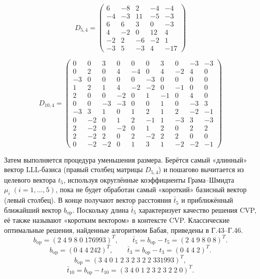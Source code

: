 \begin{equation}
D_{5,4} =
\begin{pmatrix}
  6 & -8 &  2 & -4 & -4 \\
 -4 & -3 & 11 & -5 & -3 \\
  6 &  6 &  3 &  0 & -3 \\
  4 & -2 &  0 & 12 &  4 \\
 -2 &  2 & -6 & -2 &  1 \\
 -3 &  5 & -3 &  4 & -17
\end{pmatrix}
\end{equation}

\begin{equation}
D_{10,4} =
\begin{pmatrix}
 0 &  0 &  3 &  0 &  0 &  0 &  3 &  0 & -3 & -3 \\
 0 &  2 &  0 &  4 & -4 &  0 &  4 & -2 &  4 &  0 \\
-3 &  0 &  0 &  0 &  0 & -3 &  0 &  0 &  0 &  0 \\
 1 &  2 &  1 &  4 & -2 & -2 &  0 & -1 &  0 &  0 \\
 2 &  0 &  0 & -2 &  0 &  1 & -1 &  0 &  4 &  0 \\
 0 &  0 & -3 & -3 &  0 &  0 &  1 &  0 & -3 &  3 \\
-3 &  3 &  1 &  0 &  1 &  2 &  1 &  2 & -2 & -1 \\
 0 & -2 &  0 &  1 &  2 & -1 &  1 & -3 &  3 & -3 \\
 2 & -2 &  0 & -2 &  0 &  1 &  2 &  0 &  2 &  2 \\
 2 & -2 &  2 &  0 &  2 & -2 &  2 &  2 &  0 &  0 \\
 0 & -2 & -2 &  0 &  1 &  3 &  1 & -2 & -2 & -1
\end{pmatrix}
\end{equation}

Затем выполняется процедура уменьшения размера. Берётся самый «длинный» вектор
LLL‑базиса (правый столбец матрицы \(D_{5,4}\)) и пошагово вычитается из
целевого вектора \(t_{5}\), используя округлённые коэффициенты Грама–Шмидта
\(\mu_{i}\;(i=1,\dots,5)\), пока не будет обработан самый «короткий» базисный
вектор (левый столбец). В конце получают вектор расстояния \(\bar t_{5}\) и
приближённый ближайший вектор \(b_{\mathrm{op}}\). Поскольку длина \(\bar
t_{5}\) характеризует качество решения CVP, её также называют «коротким
вектором» в контексте CVP. Классические оптимальные решения, найденные
алгоритмом Бабая, приведены в Г.43–Г.46.
\begin{equation}
b_{\text{op}} =
(2\;4\;9\;8\;0\;176993)^{T},
\qquad
\bar t_{5}=b_{\text{op}}-t_{5}=
(2\;4\;9\;8\;0\;8)^{T}.
\end{equation}
\begin{equation}
b_{\text{op}} =
(0\;4\;4\;242)^{T},
\qquad
\bar t_{3}=b_{\text{op}}-t_{3}=
(0\;4\;4\;2)^{T}.
\end{equation}
\begin{equation}
b_{\text{op}} =
(3\;4\;0\;1\;2\;3\;2\;3\;2\;2\;331993)^{T},
\end{equation}
\begin{equation}
\bar t_{10}=b_{\text{op}}-t_{10}=
(3\;4\;0\;1\;2\;3\;2\;3\;2\;2\;0)^{T}.
\end{equation}

